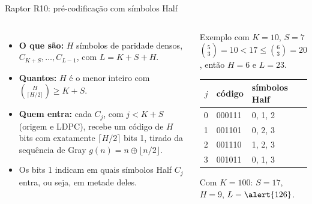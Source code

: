 \documentclass[aspectratio=169,10pt]{beamer}
\begin{document}
\begin{frame}{Raptor R10: pré-codificação com símbolos Half}
	\begin{columns}[T, onlytextwidth]
		\begin{itemize}\setlength{\itemsep}{0.45em}
			\item \textbf{O que são:} $H$ símbolos de paridade \alert{densos}, $C_{K+S}, \ldots, C_{L-1}$, com $L = K + S + H$.
			\item \textbf{Quantos:} $H$ é o menor inteiro com $\binom{H}{\lceil H/2 \rceil} \ge K + S$.
			\item \textbf{Quem entra:} cada $C_j$, com $j < K + S$ (origem e LDPC), recebe um código de $H$ bits com exatamente $\lceil H/2 \rceil$ bits 1, tirado da sequência de Gray $g(n) = n \oplus \lfloor n/2 \rfloor$.
			\item Os bits 1 indicam em quais símbolos Half $C_j$ entra, ou seja, em \alert{metade} deles.
		\end{itemize}
		\begin{block}{Exemplo com $K = 10$, $S = 7$}
			\small
			$\binom{5}{3} = 10 < 17 \le \binom{6}{3} = 20$, então $H = 6$ e $L = 23$.
			\par\vspace{0.4em}
			\centering
			\renewcommand{\arraystretch}{1.1}
			\begin{tabular}{rll}
				$j$ & código & símbolos Half \\
				\midrule
				0 & 000111 & 0, 1, 2 \\
				1 & 001101 & 0, 2, 3 \\
				2 & 001110 & 1, 2, 3 \\
				3 & 001011 & 0, 1, 3 \\
			\end{tabular}
			\par\vspace{0.5em}
			\raggedright
			Com $K = 100$: $S = 17$, $H = 9$, $L = \alert{126}$.
		\end{block}
	\end{columns}
\end{frame}
\end{document}

